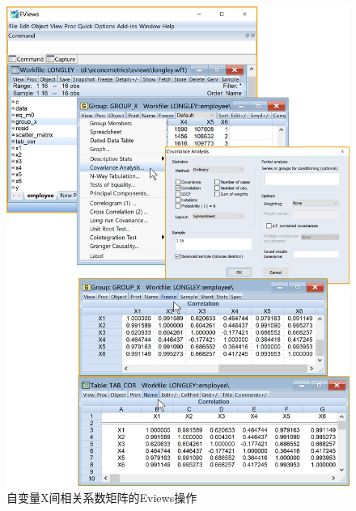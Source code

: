 \documentclass[12pt,(landscape,a4paper),(portrait,a4paper)]{article}
\begin{document}
\begin{figure}

{\centering \includegraphics[width=8in]{picture/lab5-multilinearity/2-tab-cor} 

}

\caption{自变量X间相关系数矩阵的Eviews操作}\label{fig:fig-cor}
\end{figure}
\end{document}
